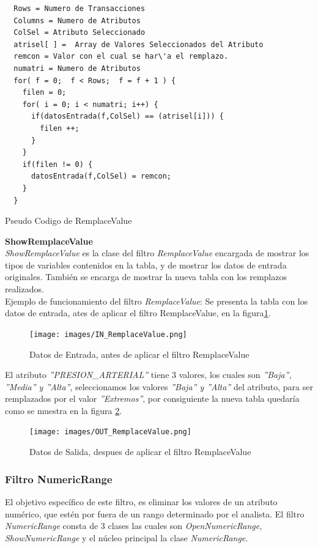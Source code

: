 \begin{codigof}[!h]
\begin{verbatim}       
  Rows = Numero de Transacciones
  Columns = Numero de Atributos
  ColSel = Atributo Seleccionado
  atrisel[ ] =  Array de Valores Seleccionados del Atributo
  remcon = Valor con el cual se har\'a el remplazo. 
  numatri = Numero de Atributos     
  for( f = 0;  f < Rows;  f = f + 1 ) {
    filen = 0;
    for( i = 0; i < numatri; i++) {
      if(datosEntrada(f,ColSel) == (atrisel[i])) {
        filen ++;
      }
    }
    if(filen != 0) {                     
      datosEntrada(f,ColSel) = remcon;
    }
  } 
\end{verbatim}
\caption{Pseudo Codigo de RemplaceValue}
\label{codRemplaceValue}
\end{codigof}

\textbf{ShowRemplaceValue} \\ 
\textit{ShowRemplaceValue}
es la clase del filtro \textit{RemplaceValue} encargada de mostrar los tipos de variables contenidos en la tabla, y de mostrar los datos de entrada originales. Tambi\'en se encarga de mostrar la nueva tabla con los remplazos realizados. \\
 
Ejemplo de funcionamiento del filtro \textit{RemplaceValue}:
Se presenta la tabla con los datos de entrada, ates de aplicar el filtro RemplaceValue, en la figura\ref{IN_RemplaceValue}. \\

\begin{figure}[h]
\centering
\texttt{[image: images/IN\_RemplaceValue.png]}
\caption{Datos de Entrada, antes de aplicar el filtro RemplaceValue}
\label{IN_RemplaceValue}
\end{figure}

El atributo \textit{''PRESION\_ARTERIAL''} tiene 3 valores, los cuales son \textit{''Baja'',  ''Media'' y ''Alta''}, seleccionamos los valores \textit{''Baja'' y ''Alta''} del atributo, para ser remplazados por el valor \textit{''Extremos''}, por consiguiente la nueva tabla quedar\'ia como se muestra en la figura \ref{OUT_RemplaceValue}. \\

\begin{figure}[h]
\centering
\texttt{[image: images/OUT\_RemplaceValue.png]}
\caption{Datos de Salida, despues de aplicar el filtro RemplaceValue}
\label{OUT_RemplaceValue}
\end{figure}

\subsubsection{Filtro NumericRange}
El objetivo espec\'ifico de este filtro, es eliminar los valores de un atributo num\'erico, que est\'en por fuera de un rango determinado por el analista.
El filtro  \textit{NumericRange} consta de 3 clases las cuales son \textit{OpenNumericRange, ShowNumericRange} y el n\'ucleo principal la clase \textit{NumericRange}. \\

